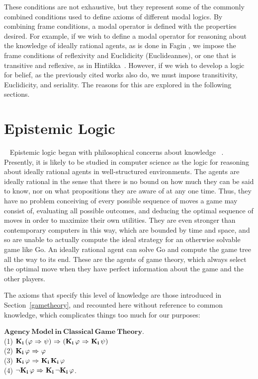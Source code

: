 These conditions are not exhaustive, but they represent some of the commonly combined conditions used to define axioms of different modal logics. By combining frame conditions, a modal operator is defined with the properties desired. For example, if we wish to define a modal operator for reasoning about the knowledge of ideally rational agents, as is done in Fagin \etal\cite{FHMV}, we impose the frame conditions of reflexivity and Euclidicity (Euclideannes), or one that is transitive and reflexive, as in Hintikka~\cite{Hintikka}. However, if we wish to develop a logic for belief, as the previously cited works also do, we must impose transitivity, Euclidicity, and seriality. The reasons for this are explored in the following sections.

\section{Epistemic Logic}~\label{epistemic_logic}
Epistemic logic began with philosophical concerns about knowledge ~\cite{FHMV,Hintikka,rescher}. Presently, it is likely to be studied in computer science as the logic for reasoning about ideally rational agents in well-structured environments. The agents are ideally rational in the sense that there is no bound on how much they can be said to know, nor on what propositions they are aware of at any one time. Thus, they have no problem conceiving of every possible sequence of moves a game may consist of, evaluating all possible outcomes, and deducing the optimal sequence of moves in order to maximize their own utilities. They are even stronger than contemporary computers in this way, which are bounded by time and space, and so are unable to actually compute the ideal strategy for an otherwise solvable game like Go. An ideally rational agent can solve Go and compute the game tree all the way to its end. These are the agents of game theory, which always select the optimal move when they have perfect information about the game and the other players.

The axioms that specify this level of knowledge are those introduced in Section~\ref{gametheory}, and recounted here without reference to common knowledge, which complicates things too much for our purposes:

$\mathbf{Agency\  Model\  in\  Classical\  Game\  Theory}$.\\
(1) $\mathbf{K}_{\mathbf{i}}\,(\varphi {\ \Rightarrow \ } \psi) {\ \Rightarrow \ } (\mathbf{K}_{\mathbf{i}}\,\varphi {\ \Rightarrow \ } \mathbf{K}_{\mathbf{i}}\,\psi)$\\
(2) $\mathbf{K}_{\mathbf{i}}\,\varphi {\ \Rightarrow \ } \varphi$\\
(3) $\mathbf{K}_{\mathbf{i}}\,\varphi {\ \Rightarrow \ } \mathbf{K}_{\mathbf{i}}\,\mathbf{K}_{\mathbf{i}}\,\varphi$\\
(4) ${\neg} \mathbf{K}_{\mathbf{i}}\,\varphi {\ \Rightarrow \ } \mathbf{K}_{\mathbf{i}}\,{\neg}\mathbf{K}_{\mathbf{i}}\,\varphi$.

